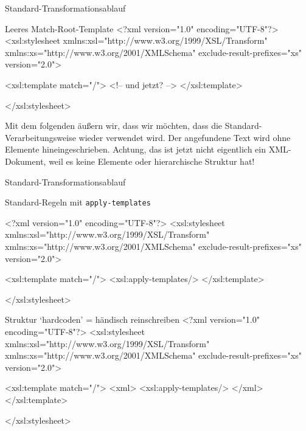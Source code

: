 \begin{frame}{Standard-Transformationsablauf}
\begin{myxml}{Leeres Match-Root-Template}
<?xml version="1.0" encoding="UTF-8"?>
<xsl:stylesheet xmlns:xsl="http://www.w3.org/1999/XSL/Transform"
    xmlns:xs="http://www.w3.org/2001/XMLSchema"
    exclude-result-prefixes="xs"
    version="2.0">
       
    <xsl:template match="/">
        <!-- und jetzt? -->
    </xsl:template>
    
</xsl:stylesheet>
\end{myxml}
Mit dem folgenden äußern wir, dass wir möchten, dass die Standard-Verarbeitungsweise wieder verwendet wird. Der angefundene Text wird ohne Elemente hineingeschrieben. Achtung, das ist jetzt nicht eigentlich ein XML-Dokument, weil es keine Elemente oder hierarchische Struktur hat!

\end{frame}

\begin{frame}{Standard-Transformationsablauf}
\begin{myxml}{Standard-Regeln mit \texttt{apply-templates}}

<?xml version="1.0" encoding="UTF-8"?>
<xsl:stylesheet xmlns:xsl="http://www.w3.org/1999/XSL/Transform"
    xmlns:xs="http://www.w3.org/2001/XMLSchema"
    exclude-result-prefixes="xs"
    version="2.0">
       
    <xsl:template match="/">
        <xsl:apply-templates/>
    </xsl:template>
    
</xsl:stylesheet>
\end{myxml}

\begin{myxml}{Struktur `hardcoden' = händisch reinschreiben}
<?xml version="1.0" encoding="UTF-8"?>
<xsl:stylesheet xmlns:xsl="http://www.w3.org/1999/XSL/Transform"
    xmlns:xs="http://www.w3.org/2001/XMLSchema"
    exclude-result-prefixes="xs"
    version="2.0">
       
    <xsl:template match="/">
        <xml>
            <xsl:apply-templates/> 
        </xml>
    </xsl:template>
    
</xsl:stylesheet>
\end{myxml}
\end{frame}

